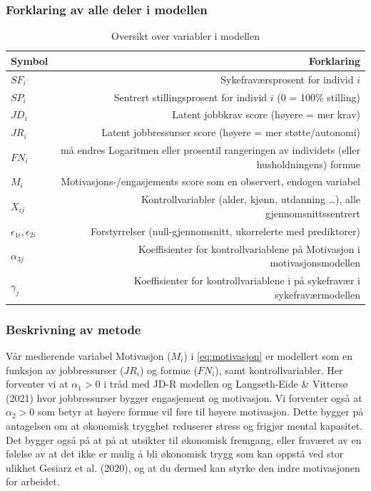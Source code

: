 \documentclass[
  12pt,
  a4paper,
  DIV=11,
  numbers=noendperiod]{scrartcl}
\begin{document}
\subsubsection{Forklaring av alle deler i
modellen}\label{forklaring-av-alle-deler-i-modellen}

\begin{table}[H]
\centering
\begin{tabular}{lr}
\toprule
Symbol & Forklaring \\ 
\midrule
$SF_i$ & Sykefraværsprosent for individ $i$ \\
$SP_i$ & Sentrert stillingsprosent for individ $i$ (0 = 100\% stilling) \\
$JD_i$ & Latent jobbkrav score (høyere = mer krav) \\
$JR_i$ & Latent jobbressurser score (høyere = mer støtte/autonomi) \\
$FN_i$ & må endres Logaritmen eller prosentil rangeringen av individets (eller husholdningens) formue \\
$M_i$ & Motivasjons-/engasjements score som en observert, endogen variabel \\
$X_{ij}$ & Kontrollvariabler (alder, kjønn, utdanning …), alle gjennomsnittssentrert \\
$\epsilon_{1i}, \epsilon_{2i}$ & Forstyrrelser (null-gjennomsnitt, ukorrelerte med prediktorer) \\  
$\alpha_{3j} $ & Koeffisienter for kontrollvariablene på Motivasjon i motivasjonsmodellen \\
$\gamma_{j} $ & Koeffisienter for kontrollvariablene i på sykefravær i sykefraværmodellen \\
\hline
\end{tabular}
\caption{Oversikt over variabler i modellen}
\label{tab:variabler}
\end{table}

\subsubsection{Beskrivning av metode}\label{beskrivning-av-metode}

Vår medierende variabel Motivasjon (\(M_i\)) i \autoref{eq:motivasjon}
er modellert som en funksjon av jobbressurser (\(JR_i\)) og formue
(\(FN_i\)), samt kontrollvariabler. Her forventer vi at \(\alpha_1 > 0\)
i tråd med JD-R modellen og Langseth-Eide \& Vittersø (2021) hvor
jobbressurser bygger engasjement og motivasjon. Vi forventer også at
\(\alpha_2 > 0\) som betyr at høyere formue vil føre til høyere
motivasjon. Dette bygger på antagelsen om at økonomisk trygghet
reduserer stress og frigjør mental kapasitet. Det bygger også på at på
at utsikter til økonomisk fremgang, eller fraværet av en følelse av at
det ikke er mulig å bli økonomisk trygg som kan oppstå ved stor ulikhet
Gesiarz et al. (2020), og at du dermed kan styrke den indre motivasjonen
for arbeidet.
\end{document}
